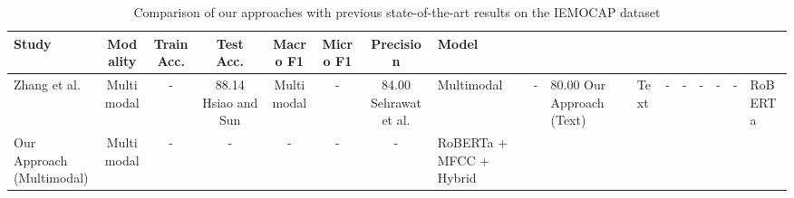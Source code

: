 \begin{table}[h]
\centering
\caption{Comparison of our approaches with previous state-of-the-art results on the IEMOCAP dataset}
\label{tab:sota_comparison}
\begin{tabular}{|l|c|c|c|c|c|c|l|}
\hline
\textbf{Study} & \textbf{Modality} & \textbf{Train Acc.} & \textbf{Test Acc.} & \textbf{Macro F1} & \textbf{Micro F1} & \textbf{Precision} & \textbf{Model} \\
\hline
Zhang et al. & Multimodal & - & 88.14%
\hline
Hsiao and Sun & Multimodal & - & 84.00%
\hline
Sehrawat et al. & Multimodal & - & 80.00%
\hline
Our Approach (Text) & Text & - & - & - & - & - & RoBERTa \\
\hline
Our Approach (Multimodal) & Multimodal & - & - & - & - & - & RoBERTa + MFCC + Hybrid \\
\hline
\end{tabular}
\end{table}

